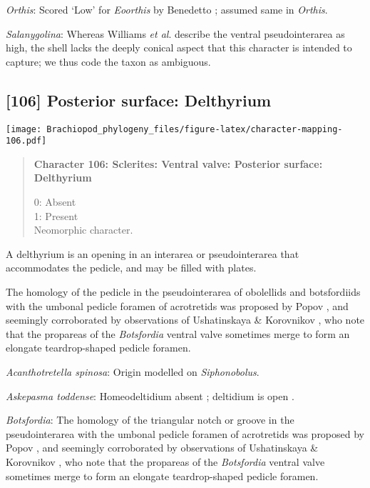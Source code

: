 \documentclass[openany]{book}
\theoremstyle{definition}
\theoremstyle{definition}
\theoremstyle{definition}
\theoremstyle{remark}
\begin{document}
\hypertarget{Orthis-coding-105}{}
\emph{Orthis}: Scored `Low' for \emph{Eoorthis} by Benedetto
\citeyearpar{Benedetto2009iChaniella}; assumed same in \emph{Orthis}.

\hypertarget{Salanygolina-coding-105}{}
\emph{Salanygolina}: Whereas Williams \emph{et al}.
\citeyearpar[p.~156]{Williams2000LinguliformeaCraniiformea} describe the
ventral pseudointerarea as high, the shell lacks the deeply conical
aspect that this character is intended to capture; we thus code the
taxon as ambiguous.

\subsection*{{[}106{]} Posterior surface:
Delthyrium}\label{posterior-surface-delthyrium}

\texttt{[image: Brachiopod\_phylogeny\_files/figure-latex/character-mapping-106.pdf]}

\begin{quote}
\textbf{Character 106: Sclerites: Ventral valve: Posterior surface:
Delthyrium}

0: Absent\\
1: Present\\
Neomorphic character.
\end{quote}

A delthyrium is an opening in an interarea or pseudointerarea that
accommodates the pedicle, and may be filled with plates.

The homology of the pedicle in the pseudointerarea of obolellids and
botsfordiids with the umbonal pedicle foramen of acrotretids was
proposed by Popov \citeyearpar{Popov1992TheCambrian}, and seemingly
corroborated by observations of Ushatinskaya \& Korovnikov
\citeyearpar{Ushatinskaya2016Revisionof}, who note that the propareas of
the \emph{Botsfordia} ventral valve sometimes merge to form an elongate
teardrop-shaped pedicle foramen.

\hypertarget{Acanthotretella_spinosa-coding-106}{}
\emph{Acanthotretella spinosa}: Origin modelled on \emph{Siphonobolus}.

\hypertarget{Askepasma_toddense-coding-106}{}
\emph{Askepasma toddense}: Homeodeltidium absent
\citep[p.~153]{Williams2000LinguliformeaCraniiformea}; deltidium is open
\citep[see][fig. 4]{Topper2013Theoldest}.

\hypertarget{Botsfordia-coding-106}{}
\emph{Botsfordia}: The homology of the triangular notch or groove in the
pseudointerarea with the umbonal pedicle foramen of acrotretids was
proposed by Popov \citeyearpar{Popov1992TheCambrian}, and seemingly
corroborated by observations of Ushatinskaya \& Korovnikov
\citeyearpar{Ushatinskaya2016Revisionof}, who note that the propareas of
the \emph{Botsfordia} ventral valve sometimes merge to form an elongate
teardrop-shaped pedicle foramen.
\end{document}
